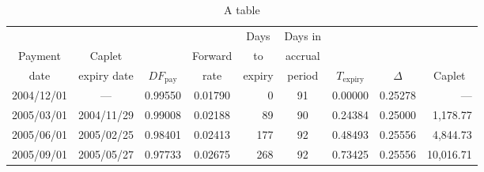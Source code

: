 \documentclass{article}
\begin{document}
\begin{table}[htbp]
\begin{center}\footnotesize
  \begin{tabular}{ccccrcccr}
  \toprule
  \color{blue} & \color{blue} & \color{blue} & \color{blue} & \multicolumn{1}{c}{\color{blue}Days} & \color{blue}Days in & \color{blue} & \color{blue} & \color{blue}\\
\color{blue}Payment & \color{blue}Caplet & \color{blue} & \color{blue}Forward & \multicolumn{1}{c}{\color{blue}to} & \color{blue}accrual & \color{blue} & \color{blue}\\
  \color{blue}date & \color{blue}expiry date & \color{blue}$DF_\text{pay}$ & \color{blue}rate & \multicolumn{1}{c}{\color{blue}expiry} & \color{blue}period & \color{blue}$T_\text{expiry}$ & \color{blue}$\Delta$ & \multicolumn{1}{c}{\color{blue}Caplet} \\
\midrule
  \color{AccessibleGreen}2004/12/01 & \color{AccessibleGreen}--- & \color{AccessibleGreen}0.99550 & \color{AccessibleGreen}0.01790 & \color{AccessibleGreen}0 & \color{AccessibleGreen}91 & \color{AccessibleGreen}0.00000 & \color{AccessibleGreen}0.25278 & \color{AccessibleGreen}--- \hspace*{0.15in}\\
  \color{AccessibleGreen}2005/03/01 & \color{AccessibleGreen}2004/11/29 & \color{AccessibleGreen}0.99008 & \color{AccessibleGreen}0.02188 & \color{AccessibleGreen}89 & \color{AccessibleGreen}90 & \color{AccessibleGreen}0.24384 & \color{AccessibleGreen}0.25000 & \color{AccessibleGreen}1,178.77\\
  \color{AccessibleGreen}2005/06/01 & \color{AccessibleGreen}2005/02/25 & \color{AccessibleGreen}0.98401 & \color{AccessibleGreen}0.02413 & \color{AccessibleGreen}177 & \color{AccessibleGreen}92 & \color{AccessibleGreen}0.48493 & \color{AccessibleGreen}0.25556 & \color{AccessibleGreen}4,844.73\\
  \color{AccessibleGreen}2005/09/01 & \color{AccessibleGreen}2005/05/27 & \color{AccessibleGreen}0.97733 & \color{AccessibleGreen}0.02675 & \color{AccessibleGreen}268 & \color{AccessibleGreen}92 & \color{AccessibleGreen}0.73425 & \color{AccessibleGreen}0.25556 & \color{AccessibleGreen}10,016.71\\
  \bottomrule
\end{tabular}
\end{center}
\caption{A table}
\end{table}
\end{document}
